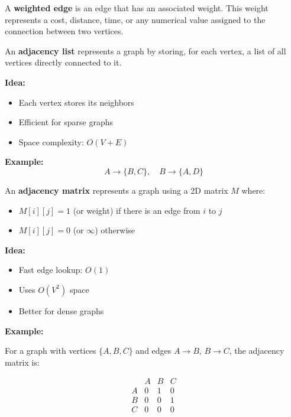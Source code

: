 \documentclass[11pt,a4paper,openany]{book}
\begin{document}
\begin{defnbox}[title=Weighted Edge]
A \textbf{weighted edge} is an edge that has an associated weight.  
This weight represents a cost, distance, time, or any numerical value assigned to the connection between two vertices.
\end{defnbox}

\begin{defnbox}[title=Adjacency List Representation]
An \textbf{adjacency list} represents a graph by storing, for each vertex, a list of all vertices directly connected to it.

\textbf{Idea:}
\begin{itemize}
    \item Each vertex stores its neighbors
    \item Efficient for sparse graphs
    \item Space complexity: $O(V + E)$
\end{itemize}

\textbf{Example:}
\[
A \rightarrow \{B, C\}, \quad B \rightarrow \{A, D\}
\]
\end{defnbox}

\begin{defnbox}[title=Adjacency Matrix Representation]
An \textbf{adjacency matrix} represents a graph using a 2D matrix $M$ where:

\begin{itemize}
    \item $M[i][j] = 1$ (or weight) if there is an edge from $i$ to $j$
    \item $M[i][j] = 0$ (or $\infty$) otherwise
\end{itemize}

\textbf{Idea:}
\begin{itemize}
    \item Fast edge lookup: $O(1)$
    \item Uses $O(V^2)$ space
    \item Better for dense graphs
\end{itemize}

\textbf{Example:}

For a graph with vertices $\{A, B, C\}$ and edges $A \rightarrow B$, $B \rightarrow C$, the adjacency matrix is:

\[
\begin{array}{c|ccc}
    & A & B & C \\
\hline
A & 0 & 1 & 0 \\
B & 0 & 0 & 1 \\
C & 0 & 0 & 0 \\
\end{array}
\]
\end{defnbox}
\end{document}
